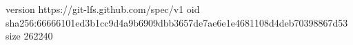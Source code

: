 version https://git-lfs.github.com/spec/v1
oid sha256:66666101ed3b1cc9d4a9b6909dbb3657de7ae6e1e4681108d4deb70398867d53
size 262240
